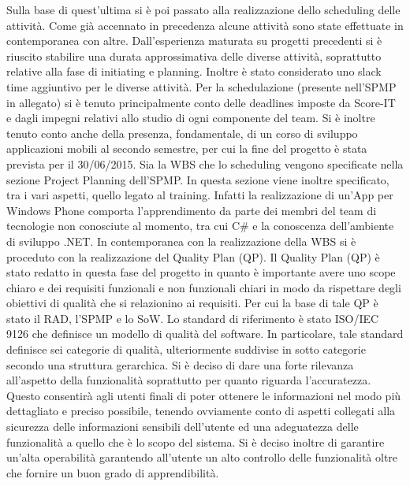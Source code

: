 Sulla base di quest\rq ultima si \`{e} poi passato alla realizzazione dello scheduling delle attivit\`{a}.
Come gi\`{a} accennato in precedenza alcune attivit\`{a} sono state effettuate in contemporanea con altre. Dall\rq esperienza maturata su progetti precedenti si \`{e} riuscito stabilire una durata approssimativa delle diverse attivit\`{a}, soprattutto relative alla fase di initiating e planning.
Inoltre \`{e} stato considerato uno slack time aggiuntivo per le diverse attivit\`{a}.
Per la schedulazione (presente nell\rq SPMP in allegato) si \`{e} tenuto principalmente conto delle deadlines imposte da Score-IT e dagli impegni relativi allo studio di ogni componente del team.
Si \`{e} inoltre tenuto conto anche della presenza, fondamentale, di un corso di sviluppo applicazioni mobili al secondo semestre, per cui la fine del progetto \`{e} stata prevista per il 30/06/2015.
Sia la WBS che lo scheduling vengono specificate nella sezione Project Planning dell\rq SPMP. In questa sezione viene inoltre specificato, tra i vari aspetti, quello legato al training.
Infatti la realizzazione di un\rq App per Windows Phone comporta l\rq apprendimento da parte dei membri del team di tecnologie non conosciute al momento, tra cui C\# e la conoscenza dell\rq ambiente di sviluppo .NET. In contemporanea con la realizzazione della WBS si \`{e} proceduto con la realizzazione del Quality Plan (QP). Il Quality Plan (QP) \`{e} stato redatto in questa fase del progetto in quanto \`{e} importante avere uno scope chiaro e dei requisiti funzionali e non funzionali chiari in modo da rispettare degli obiettivi di qualit\`{a} che si relazionino ai requisiti. Per cui la base di tale QP \`{e} stato il RAD, l\rq SPMP e lo SoW.
Lo standard di riferimento \`{e} stato ISO/IEC 9126 che definisce un modello di qualit\`{a} del software. In particolare, tale standard definisce sei categorie di qualit\`{a}, ulteriormente suddivise in sotto categorie secondo una struttura gerarchica. Si \`{e} deciso di dare una forte rilevanza all\rq aspetto della funzionalit\`{a} soprattutto per quanto riguarda l\rq accuratezza.
Questo consentir\`{a} agli utenti finali di poter ottenere le informazioni nel modo pi\`{u} dettagliato e preciso possibile, tenendo ovviamente conto di aspetti collegati alla sicurezza delle informazioni sensibili dell\rq utente ed una adeguatezza delle funzionalit\`{a} a quello che \`{e} lo scopo del sistema.
Si \`{e} deciso inoltre di garantire un\rq alta operabilit\`{a} garantendo all\rq utente un alto controllo delle funzionalit\`{a} oltre che fornire un buon grado di apprendibilit\`{a}.
